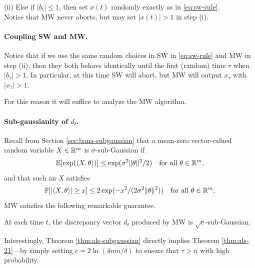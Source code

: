(ii) Else if $|b_t|\leq 1$, then set $x(t)$ randomly exactly as in \eqref{eq:sw-rule}.\\

Notice that MW never aborts, but may set $|x(t)|>1$ in step (i).

\paragraph{Coupling SW and MW.} Notice that if we use the same random choices in SW in \eqref{eq:sw-rule} and MW in step (ii), then they both behave identically until the first (random) time $\tau$ when $|b_{\tau}|>1$. In particular, at this time SW will abort, but MW will output $x_\tau$ with $|x_\tau|>1$. 

For this reason it will suffice to analyze the MW algorithm. 

\paragraph{Sub-gaussianity of $d_t$.}
Recall %
from Section \ref{sec:bana-subgaussian} that 
a mean-zero vector-valued random variable  $X \in \mathbb{R}^m$  is $\sigma$-sub-Gaussian if
\begin{equation}
    \label{eq:als-subg-general}
\mathbb{E}[\exp( \langle X,\theta \rangle )] \leq \exp (\sigma^2 \|\theta\|^2/2) \quad \text{for all $\theta \in \mathbb{R}^m$},
\end{equation}
and that such an $X$ satisfies
\begin{equation}
\label{eq:als-tail}
    \mathbb{P}[ |\langle X,\theta\rangle | \geq x] \leq 2 \exp(-x^2/(2\sigma^2\|\theta\|^2)) \quad \text{for all $\theta \in \mathbb{R}^m$}.
\end{equation}
MW satisfies the  following remarkable guarantee.
\begin{theorem}
\label{thm:als-subgaussian}
    At each time $t$, the discrepancy vector $d_t$ produced by MW is
    $\sqrt{c}$-sub-Gaussian. %
\end{theorem}
Interestingly, Theorem \ref{thm:als-subgaussian} directly implies Theorem \ref{thm:als-21}---by simply setting $c = 2 \ln (4mn/\delta)$ to ensure that $\tau > n$ with high probability.


